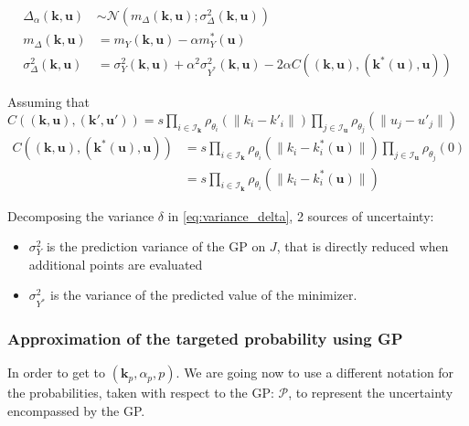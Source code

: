 \documentclass[a4paper,11pt]{article}
\newcommand{\ProbGP}{\mathcal{P}}
\theoremstyle{defi}
\numberwithin{thmCounter}{section}
\begin{document}
\begin{align}
  \Delta_{\alpha}(\mathbf{k},\mathbf{u}) &\sim \mathcal{N}\left(m_{\Delta}(\mathbf{k},\mathbf{u}); \sigma^2_{\Delta}(\mathbf{k},\mathbf{u})\right) \\
  m_{\Delta}(\mathbf{k},\mathbf{u}) &= m_Y(\mathbf{k},\mathbf{u}) - \alpha m_Y^*(\mathbf{u}) \\
  \sigma^2_{\Delta}(\mathbf{k},\mathbf{u}) &= \sigma_Y^2(\mathbf{k},\mathbf{u}) + \alpha^2 \sigma_{Y^*}^2(\mathbf{k},\mathbf{u}) - 2\alpha C\left((\mathbf{k},\mathbf{u}),(\mathbf{k}^*(\mathbf{u}),\mathbf{u})\right) \label{eq:variance_delta}
\end{align}

Assuming that $C((\mathbf{k},\mathbf{u}), (\mathbf{k}',\mathbf{u}')) = s \prod_{i\in\mathcal{I}_{\mathbf{k}}}\rho_{\theta_i}(\|k_i - k'_i\|) \prod_{j\in\mathcal{I}_{\mathbf{u}}} \rho_{\theta_j}(\|u_j - u'_j\|)$
\begin{align}
  C\left((\mathbf{k},\mathbf{u}),(\mathbf{k}^*(\mathbf{u}),\mathbf{u})\right) &= s \prod_{i\in\mathcal{I}_{\mathbf{k}}}\rho_{\theta_i}(\|k_i - k^*_i(\mathbf{u})\|)\prod_{j\in\mathcal{I}_{\mathbf{u}}} \rho_{\theta_j}(0) \\
  &=s \prod_{i\in\mathcal{I}_{\mathbf{k}}}\rho_{\theta_i}(\|k_i - k^*_i(\mathbf{u})\|)
\end{align}

Decomposing the variance $\delta$ in \cref{eq:variance_delta}, 2 sources of uncertainty:
\begin{itemize}
\item $\sigma^2_{Y}$ is the prediction variance of the GP on $J$, that is directly reduced when additional points are evaluated
\item $\sigma^2_{Y^*}$ is the variance of the predicted value of the minimizer. 
\end{itemize}
\subsubsection{Approximation of the targeted probability using GP}
In order to get to $(\mathbf{k}_p, \alpha_p,p)$.
We are going now to use a different notation for the probabilities, taken with respect to the GP: $\ProbGP$, to represent the uncertainty encompassed by the GP.
\end{document}
